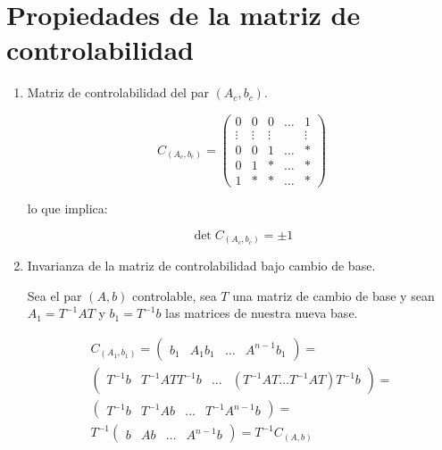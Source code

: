     \newpage
    \section{Propiedades de la matriz de controlabilidad}

        \begin{enumerate}
            \item Matriz de controlabilidad del par $(A_c, b_c)$.

                \begin{equation}
                    C_{(A_c,b_c)} =
                    \begin{pmatrix}
                    0 & 0 & 0 & \dots & 1 \\
                    \vdots & \vdots & \vdots & & \vdots \\
                    0 & 0 & 1 & \dots & * \\
                    0 & 1 & * & \dots & * \\
                    1 & * & * & \dots & *
                    \end{pmatrix}
                \end{equation}

                lo que implica:

                \begin{equation}
                    \det{C_{(A_c, b_c)}} = \pm 1
                \end{equation}

            \item Invarianza de la matriz de controlabilidad bajo cambio de base.

                Sea el par $(A, b)$ controlable, sea $T$ una matriz de cambio de base y sean $A_1 = T^{-1} A T$ y $b_1 = T^{-1} b$ las matrices de nuestra nueva base.

                \begin{multline}
                C_{(A_1, b_1)} =
                \begin{pmatrix}
                b_1 & A_1 b_1 & \dots & A^{n-1} b_1
                \end{pmatrix} = \\
                \begin{pmatrix}
                T^{-1} b & T^{-1} A T T^{-1} b & \dots & (T^{-1} A T \dots T^{-1} A T) T^{-1} b
                \end{pmatrix} = \\
                \begin{pmatrix}
                T^{-1} b & T^{-1} A b & \dots & T^{-1} A^{n-1} b
                \end{pmatrix} = \\
                T^{-1}
                \begin{pmatrix}
                b & A b & \dots & A^{n-1} b
                \end{pmatrix} =
                T^{-1} C_{(A, b)} \nonumber
                \end{multline}


\end{enumerate}
